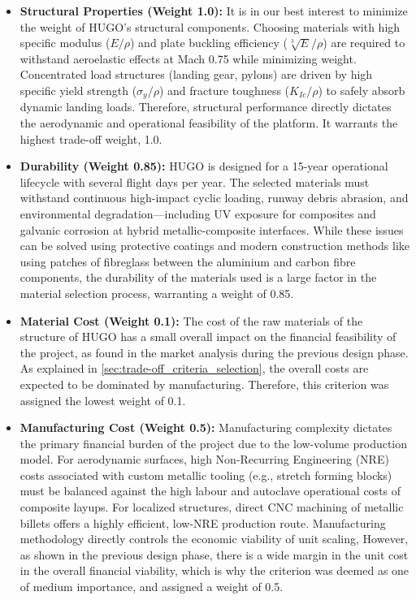 \begin{itemize}
    \item \textbf{Structural Properties (Weight 1.0):} It is in our best interest to minimize the weight of HUGO's structural components. Choosing materials with high specific modulus ($E/\rho$) and plate buckling efficiency ($\sqrt[3]{E}/\rho$) are required to withstand aeroelastic effects at Mach 0.75 while minimizing weight. Concentrated load structures (landing gear, pylons) are driven by high specific yield strength ($\sigma_y/\rho$) and fracture toughness ($K_{Ic}/\rho$) to safely absorb dynamic landing loads. Therefore, structural performance directly dictates the aerodynamic and operational feasibility of the platform. It warrants the highest trade-off weight, 1.0.
    
    \item \textbf{Durability (Weight 0.85):} HUGO is designed for a 15-year operational lifecycle with several flight days per year. The selected materials must withstand continuous high-impact cyclic loading, runway debris abrasion, and environmental degradation—including UV exposure for composites and galvanic corrosion at hybrid metallic-composite interfaces. While these issues can be solved using protective coatings and modern construction methods like using patches of fibreglass between the aluminium and carbon fibre components, the durability of the materials used is a large factor in the material selection process, warranting a weight of 0.85. 

    \item \textbf{Material Cost (Weight 0.1):} The cost of the raw materials of the structure of HUGO has a small overall impact on the financial feasibility of the project, as found in the market analysis during the previous design phase. As explained in \autoref{sec:trade-off_criteria_selection}, the overall costs are expected to be dominated by manufacturing. Therefore, this criterion was assigned the lowest weight of 0.1.

    \item \textbf{Manufacturing Cost (Weight 0.5):} Manufacturing complexity dictates the primary financial burden of the project due to the low-volume production model. For aerodynamic surfaces, high Non-Recurring Engineering (NRE) costs associated with custom metallic tooling (e.g., stretch forming blocks) must be balanced against the high labour and autoclave operational costs of composite layups. For localized structures, direct CNC machining of metallic billets offers a highly efficient, low-NRE production route. Manufacturing methodology directly controls the economic viability of unit scaling, However, as shown in the previous design phase, there is a wide margin in the unit cost in the overall financial viability, which is why the criterion was deemed as one of medium importance, and assigned a weight of 0.5.


\end{itemize}
